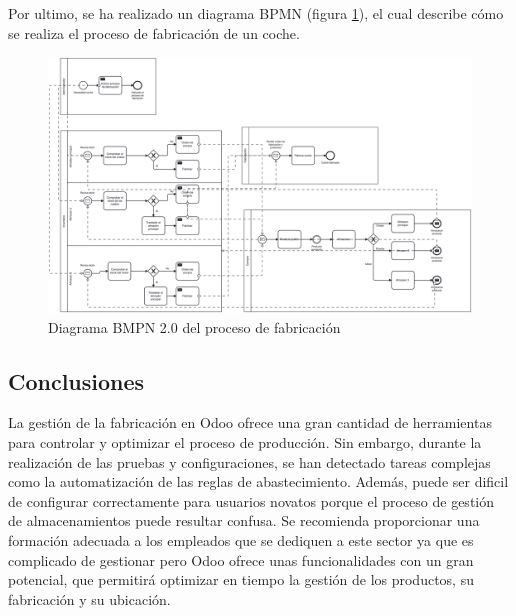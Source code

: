 Por ultimo, se ha realizado un diagrama BPMN (figura \ref{fab}), el cual describe cómo se realiza el proceso de fabricación de un coche.
\begin{figure}[h]
    \centering
    \includegraphics[width=1\linewidth]{fotosGestFab/Fabricacion.png}
    \caption{Diagrama BMPN 2.0 del proceso de fabricación}
    \label{fab}
\end{figure}
\subsection{Conclusiones}
La gestión de la fabricación en Odoo ofrece una gran cantidad de herramientas para controlar y optimizar el proceso de producción. Sin embargo, durante la realización de las pruebas y configuraciones, se han detectado tareas complejas como la automatización de las reglas de abastecimiento. Además, puede ser dificil de configurar correctamente para usuarios novatos porque el proceso de gestión de almacenamientos puede resultar confusa. Se recomienda proporcionar una formación adecuada a los empleados que se dediquen a este sector ya que es complicado de gestionar pero Odoo ofrece unas funcionalidades con un gran potencial, que permitirá optimizar en tiempo la gestión de los productos, su fabricación y su ubicación.